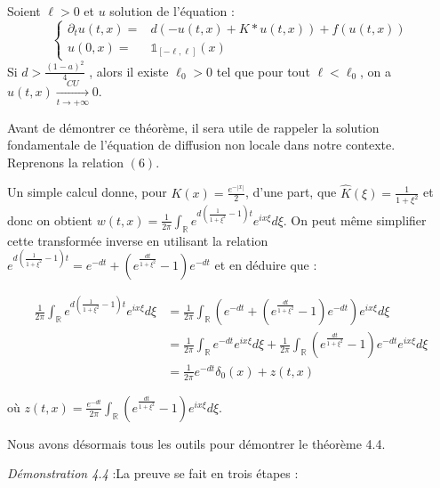 \documentclass{article}
\begin{document}
\begin{Theoreme}Soient $\ell>0$ et $u$ solution de l'équation :
\begin{equation}
\left\{
  \begin{array}{cc}
   \partial_t u(t,x) =&  d(-u(t,x)+K*u(t,x))+f(u(t,x)) \\
   u(0,x) = & \mathds{1}_{[-\ell,\ell]}(x)~~~~~~~~~~~~~~~~~~~~~~~~~~~~~~~~~~~~~~~~~~~~~~~
   \end{array}
   \right.
   \end{equation}
Si $d > \frac{(1-a)^2}{4}$ , alors il existe $\ell_0 > 0$ tel que pour tout $\ell<\ell_0$, on a $u(t,x) \underset{t \to +\infty}{\overset{CU}{\longrightarrow}}0$. \end{Theoreme}


Avant de démontrer ce théorème, il sera utile de rappeler la solution fondamentale de l'équation de diffusion non locale dans notre contexte. Reprenons la relation $(6)$.
  	
Un simple calcul donne, pour $K(x) = \frac{e^{-|x|}}{2} $, d'une part, que $\widehat{K}(\xi) = \frac{1}{1+\xi^2}$ et donc on obtient $w(t,x) = \frac{1}{2\pi} \int_{\mathbb{R}} e^{d(\frac{1}{1+\xi^2}-1)t} e^{ix \xi} d\xi$. On peut même simplifier cette transformée inverse en utilisant la relation $e^{d(\frac{1}{1+\xi^2}-1)t} = e^{-dt} + (e^{\frac{dt}{1+\xi^2}}-1)e^{-dt}$ et en déduire que :

\begin{equation}
\begin{split}
\frac{1}{2\pi} \int_{\mathbb{R}} e^{d(\frac{1}{1+\xi^2}-1)t} e^{ix \xi} d\xi & = \frac{1}{2\pi} \int_{\mathbb{R}} (e^{-dt} + (e^{\frac{dt}{1+\xi^2}}-1)e^{-dt}) e^{ix \xi} d\xi \\ 
& = \frac{1}{2\pi} \int_{\mathbb{R}} e^{-dt}e^{ix\xi} d\xi + \frac{1}{2\pi} \int_{\mathbb{R}}(e^{\frac{dt}{1+\xi^2}}-1)e^{-dt} e^{ix \xi} d\xi \\ 
& = \frac{1}{2\pi} e^{-dt}\delta_0(x) + z(t,x)
\end{split}
\end{equation}

\noindent où $z(t,x) = \frac{e^{-dt}}{2\pi} \int_{\mathbb{R}}(e^{\frac{dt}{1+\xi^2}}-1) e^{ix \xi} d\xi$.

\noindent Nous avons désormais tous les outils pour démontrer le théorème 4.4.\newline

\noindent \textit{Démonstration 4.4} :La preuve se fait en trois étapes : \newline
\end{document}
